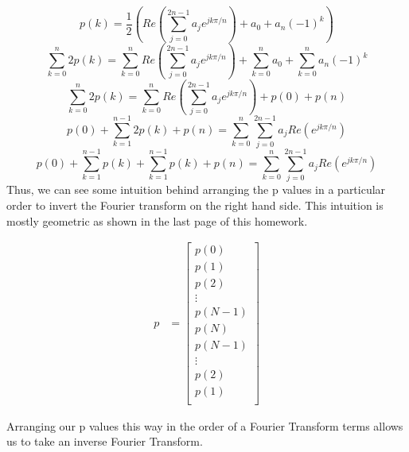 \documentclass[letterpaper,12pt]{article}
\begin{document}
\begin{enumerate}
\[ p ( k) = \frac{1}{2} (Re(\sum_{j=0}^{2n-1} a_j e^{ j k \pi / n  }) + a_0 +a_n (-1)^k) \]
\[ \sum_{k=0}^n 2p ( k) = \sum_{k=0}^n  Re(\sum_{j=0}^{2n-1} a_j e^{ j k \pi / n  }) +  \sum_{k=0}^n  a_0 + \sum_{k=0}^n a_n (-1)^k \]
\[ \sum_{k=0}^n 2 p ( k) = \sum_{k=0}^n  Re(\sum_{j=0}^{2n-1} a_j e^{ j k \pi / n  }) +  p(0)+ p(n)\]
\[ p (0) +\sum_{k=1}^{n-1} 2 p ( k) + p(n) = \sum_{k=0}^n  \sum_{j=0}^{2n-1} a_j Re(e^{ j k \pi / n  }) \]
\[ p (0) +\sum_{k=1}^{n-1} p ( k)+\sum_{k=1}^{n-1} p ( k) + p(n) = \sum_{k=0}^n  \sum_{j=0}^{2n-1} a_j Re(e^{ j k \pi / n  }) \]
Thus, we can see some intuition behind arranging the p values in a particular order to invert the Fourier transform on the right hand side. This intuition is mostly geometric as shown in the last page of this homework.

  \begin{align}
    p &= \begin{bmatrix}
           p(0) \\
           p(1) \\
           p(2) \\
           \vdots \\
           p(N-1) \\
           p(N)\\
           p(N-1) \\
           \vdots \\
           p(2) \\
           p(1)\\
         \end{bmatrix}
  \end{align}
  
  Arranging our p values this way in the order of a Fourier Transform terms allows us to take an inverse Fourier Transform.
  

\end{enumerate}
\end{document}
